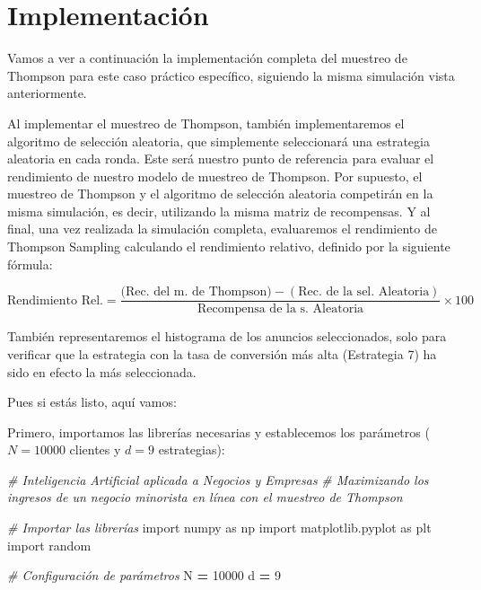\documentclass[]{book}
\newenvironment{Shaded}{\begin{snugshade}}{\end{snugshade}}
\newcommand{\CommentTok}[1]{\textcolor[rgb]{0.56,0.35,0.01}{\textit{#1}}}
\newcommand{\DecValTok}[1]{\textcolor[rgb]{0.00,0.00,0.81}{#1}}
\newcommand{\ImportTok}[1]{#1}
\newcommand{\NormalTok}[1]{#1}
\newcommand{\OperatorTok}[1]{\textcolor[rgb]{0.81,0.36,0.00}{\textbf{#1}}}
\begin{document}
\hypertarget{implementaciuxf3n-1}{%
\section{Implementación}\label{implementaciuxf3n-1}}

Vamos a ver a continuación la implementación completa del muestreo de Thompson para este caso práctico específico, siguiendo la misma simulación vista anteriormente.

Al implementar el muestreo de Thompson, también implementaremos el algoritmo de selección aleatoria, que simplemente seleccionará una estrategia aleatoria en cada ronda. Este será nuestro punto de referencia para evaluar el rendimiento de nuestro modelo de muestreo de Thompson. Por supuesto, el muestreo de Thompson y el algoritmo de selección aleatoria competirán en la misma simulación, es decir, utilizando la misma matriz de recompensas. Y al final, una vez realizada la simulación completa, evaluaremos el rendimiento de Thompson Sampling calculando el rendimiento relativo, definido por la siguiente fórmula:

\[\textrm{Rendimiento Rel.} = \frac{\textrm{(Rec. del m. de Thompson)} - (\textrm{Rec. de la sel. Aleatoria})}{\textrm{Recompensa de la s. Aleatoria}} \times 100\]

También representaremos el histograma de los anuncios seleccionados, solo para verificar que la estrategia con la tasa de conversión más alta (Estrategia 7) ha sido en efecto la más seleccionada.

Pues si estás listo, aquí vamos:

Primero, importamos las librerías necesarias y establecemos los parámetros (\(N = 10000\) clientes y \(d = 9\) estrategias):

\begin{Shaded}
\begin{Highlighting}[]
\CommentTok{# Inteligencia Artificial aplicada a Negocios y Empresas}
\CommentTok{# Maximizando los ingresos de un negocio minorista en línea con el muestreo de Thompson}

\CommentTok{# Importar las librerías}
\ImportTok{import}\NormalTok{ numpy }\ImportTok{as}\NormalTok{ np}
\ImportTok{import}\NormalTok{ matplotlib.pyplot }\ImportTok{as}\NormalTok{ plt}
\ImportTok{import}\NormalTok{ random}

\CommentTok{# Configuración de parámetros}
\NormalTok{N }\OperatorTok{=} \DecValTok{10000}
\NormalTok{d }\OperatorTok{=} \DecValTok{9}
\end{Highlighting}
\end{Shaded}
\end{document}

